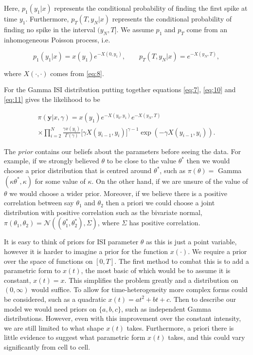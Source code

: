\documentclass[../main.tex]{subfiles}
\begin{document}
Here, $p_1(y_1|x)$ represents the conditional probability of finding the first spike at time $y_1$. Furthermore, $p_T(T,y_N|x)$ represents the conditional probability of finding no spike in the interval $(y_N, T]$. We assume $p_1$ and $p_T$ come from an inhomogeneous Poisson process, i.e.

\begin{equation} \label{eq:11}
p_1(y_1|x) = x(y_1)e^{-X(0,y_1)} , \qquad p_T(T,y_N|x) = e^{-X(y_N,T)}, 
\end{equation}
 
 where $X(\cdot,\cdot)$ comes from \eqref{eq:8}.

For the Gamma ISI distribution putting together equations \eqref{eq:7}, \eqref{eq:10} and \eqref{eq:11} gives the likelihood to be

\begin{multline}\label{eq:fulllikeli}
\pi(\mathbf{y} | x, \gamma) = x(y_1) e^{-X(y_0,y_1)} e^{-X(y_N,T)}  \\
 \times  \prod^N_{i=2}  \frac{\gamma x(y_i)}{\Gamma ( \gamma )} \big[ \gamma X(y_{i-1} , y_i ) \big]^{\gamma -1} \exp( - \gamma X(y_{i-1} , y_i )  ).
\end{multline}

The {\it prior} contains our beliefs about the parameters before seeing the data. For example, if we strongly believed  $\theta$ to be close to the value $\theta^*$ then we would choose a prior distribution that is centred around $\theta^*$, such as $\pi(\theta) =$ Gamma$(\kappa \theta^*, \kappa )$ for some value of $\kappa$. On the other hand, if we are unsure of the value of $\theta$ we would choose a wider prior. Moreover, if we believe there is a positive correlation between say $\theta_1$ and  $\theta_2$ then a priori we could choose a  joint distribution with positive correlation such as the bivariate normal, $\pi (\theta_1, \theta_2) = \mathcal{N} \left( \left( \theta_1^* , \theta_2^* \right), \Sigma \right)$, where $\Sigma$ has positive correlation. 

It is easy to think of priors for ISI parameter $\theta$ as this is just a point variable, however it is harder to imagine a prior for the function $x(\cdot)$. We require a prior over the space of functions on $[0,T]$. The first method to combat this is to add a parametric form to $x(t)$, the most basic of which would be to assume it is constant, $x(t) = x$. This simplifies the problem greatly and a distribution on $(0,\infty)$ would suffice. To allow for time-heterogeneity more complex forms could be considered,  such as a quadratic $x(t) = at^2 + bt + c$. Then to describe our model we would need priors on $\{a,b,c\}$, such as independent Gamma distributions. However, even with this improvement over the constant intensity, we are still limited to what shape $x(t)$ takes. Furthermore, a priori there is little evidence to suggest what parametric form $x(t)$ takes, and this could vary significantly from cell to cell. 
\end{document}
